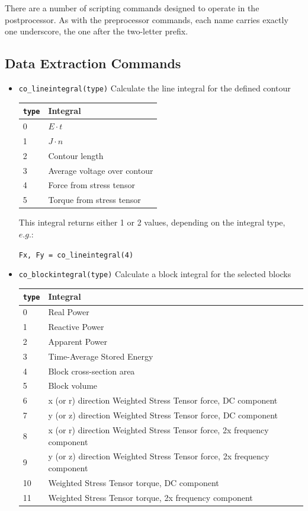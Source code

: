 There are a number of scripting commands designed to operate in
the postprocessor. As with the preprocessor commands, each name
carries exactly one underscore, the one after the two-letter prefix.

\subsection{Data Extraction Commands}
\begin{itemize}

\item \texttt{co\_lineintegral(type)} Calculate the line integral for the defined contour


\begin{tabular}{ll}
\texttt{type} & Integral \\ \hline
 0 & $E \cdot t$ \\
 1 & $J \cdot n$ \\
 2 & Contour length \\
 3 & Average voltage over contour \\
 4 & Force from stress tensor \\
 5 & Torque from stress tensor
\end{tabular}

This integral returns either 1 or 2 values, depending on the
integral type, $e.g.:$

\texttt{Fx, Fy = co\_lineintegral(4)}

\item \texttt{co\_blockintegral(type)} Calculate a block integral for the selected
blocks

\begin{tabular}{ll}
\texttt{type} & Integral \\ \hline
	 0  & Real Power \\
	 1  & Reactive Power \\
	 2  & Apparent Power \\
	 3  & Time-Average Stored Energy \\
	 4  & Block cross-section area \\
	 5  & Block volume \\
	 6  & x (or r) direction Weighted Stress Tensor force, DC component \\
	 7  & y (or z) direction Weighted Stress Tensor force, DC component \\
	 8  & x (or r) direction Weighted Stress Tensor force, 2x frequency component \\
	 9  & y (or z) direction Weighted Stress Tensor force, 2x frequency component \\
	 10 & Weighted Stress Tensor torque, DC component \\
	 11 & Weighted Stress Tensor torque, 2x frequency component
\end{tabular}


\end{itemize}
